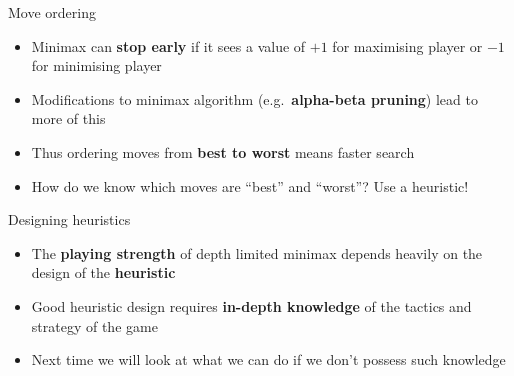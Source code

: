 \begin{frame}{Move ordering}
	\begin{itemize}
		\pause\item Minimax can \textbf{stop early} if it sees a value of $+1$ for maximising player or $-1$
			for minimising player
		\pause\item Modifications to minimax algorithm (e.g.\ \textbf{alpha-beta pruning}) lead to more of this
		\pause\item Thus ordering moves from \textbf{best to worst} means faster search
		\pause\item How do we know which moves are ``best'' and ``worst''? Use a heuristic!
	\end{itemize}
\end{frame}

\begin{frame}{Designing heuristics}
	\begin{itemize}
		\pause\item The \textbf{playing strength} of depth limited minimax depends heavily on the design of the \textbf{heuristic}
		\pause\item Good heuristic design requires \textbf{in-depth knowledge} of the tactics and strategy of the game
		\pause\item Next time we will look at what we can do if we don't possess such knowledge
	\end{itemize}
\end{frame}

